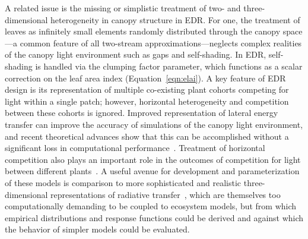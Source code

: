 A related issue is the missing or simplistic treatment of two- and three-dimensional heterogeneity in canopy structure in EDR.
For one, the treatment of leaves as infinitely small elements randomly distributed through the canopy space---a common feature of all two-stream approximations---neglects complex realities of the canopy light environment such as gaps and self-shading.
In EDR, self-shading is handled via the clumping factor parameter, which functions as a scalar correction on the leaf area index (Equation~\ref{eqn:elai}).
A key feature of EDR design is its representation of multiple co-existing plant cohorts competing for light within a single patch;
however, horizontal heterogeneity and competition between these cohorts is ignored.
Improved representation of lateral energy transfer can improve the accuracy of simulations of the canopy light environment, and recent theoretical advances show that this can be accomplished without a significant loss in computational performance~\citep{hogan_2018_fast}.
Treatment of horizontal competition also plays an important role in the outcomes of competition for light between different plants~\citep{fisher2018vegetation}.
A useful avenue for development and parameterization of these models is comparison to more sophisticated and realistic three-dimensional representations of radiative transfer~\citep[e.g.][]{widlowski2007third}, which are themselves too computationally demanding to be coupled to ecosystem models, but from which empirical distributions and response functions could be derived and against which the behavior of simpler models could be evaluated.
